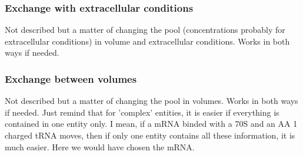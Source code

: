\subsubsection{Exchange with extracellular conditions}
Not described but a matter of changing the pool (concentrations probably for extracellular conditions) in volume and extracellular conditions. Works in both ways if needed.

\subsubsection{Exchange between volumes}
\textcolor[rgb]{1.00,0.00,0.00}{Not described but a matter of changing the pool in volumes. Works in both ways if needed. Just remind that for 'complex' entities, it is easier if everything is contained in one entity only. I mean, if a mRNA binded with a 70S and an AA 1 charged tRNA moves, then if only one entity contains all these information, it is much easier. Here we would have chosen the mRNA.} 